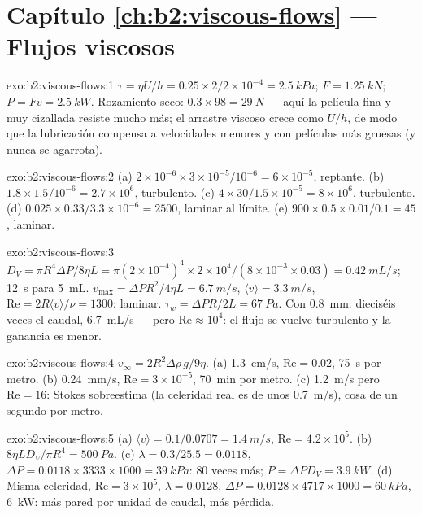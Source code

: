 \section*{Capítulo \ref{ch:b2:viscous-flows} --- Flujos viscosos}

\begin{solution}{exo:b2:viscous-flows:1}
$\tau = \eta U/h = 0.25 \times 2/2 \times 10^{-4} = \qty{2.5}{kPa}$; $F = \qty{1.25}{kN}$;
$P = Fv = \qty{2.5}{kW}$. Rozamiento seco: $0.3 \times 98 = \qty{29}{N}$ --- aquí la
película fina y muy cizallada resiste mucho más; el arrastre viscoso crece
como $U/h$, de modo que la lubricación compensa a velocidades menores y
con películas más gruesas (y nunca se agarrota).
\end{solution}

\begin{solution}{exo:b2:viscous-flows:2}
(a) $2 \times 10^{-6} \times 3 \times 10^{-5}/10^{-6} = 6 \times 10^{-5}$, reptante. (b)
$1.8 \times 1.5/10^{-6} = 2.7 \times 10^6$, turbulento. (c) $4 \times 30/1.5 \times 10^{-5}
= 8 \times 10^6$, turbulento. (d) $0.025 \times 0.33/3.3 \times 10^{-6} = 2500$,
laminar al límite. (e) $900 \times 0.5 \times 0.01/0.1 = 45$, laminar.
\end{solution}

\begin{solution}{exo:b2:viscous-flows:3}
$D_V = \pi R^4\Delta P/8\eta L = \pi(2 \times 10^{-4})^4 \times 2 \times 10^4/(8 \times 10^{-3}
\times 0.03) = \qty{0.42}{mL/s}$; \qty{12}{s} para \qty{5}{mL}. $v_{\max} = \Delta PR^2/
4\eta L = \qty{6.7}{m/s}$, $\langle v\rangle = \qty{3.3}{m/s}$, $\mathrm{Re} = 2R\langle v
\rangle/\nu = 1300$: laminar. $\tau_w = \Delta PR/2L = \qty{67}{Pa}$. Con \qty{0.8}{mm}:
dieciséis veces el caudal, \qty{6.7}{mL/s} --- pero $\mathrm{Re} \approx 10^4$: el flujo
se vuelve turbulento y la ganancia es menor.
\end{solution}

\begin{solution}{exo:b2:viscous-flows:4}
$v_\infty = 2R^2\Delta\rho\,g/9\eta$. (a) \qty{1.3}{cm/s}, $\mathrm{Re} = 0.02$, \qty{75}{s}
por metro. (b) \qty{0.24}{mm/s}, $\mathrm{Re} = 3 \times 10^{-5}$, \qty{70}{min} por
metro. (c) \qty{1.2}{m/s} pero $\mathrm{Re} = 16$: Stokes sobreestima (la
celeridad real es de unos \qty{0.7}{m/s}), cosa de un segundo por metro.
\end{solution}

\begin{solution}{exo:b2:viscous-flows:5}
(a) $\langle v\rangle = 0.1/0.0707 = \qty{1.4}{m/s}$, $\mathrm{Re} = 4.2 \times 10^5$. (b)
$8\eta LD_V/\pi R^4 = \qty{500}{Pa}$. (c) $\lambda = 0.3/25.5 = 0.0118$, $\Delta P = 0.0118
\times 3333 \times 1000 = \qty{39}{kPa}$: $80$ veces más; $P = \Delta PD_V = \qty{3.9}{kW}$.
(d) Misma celeridad, $\mathrm{Re} = 3 \times 10^5$, $\lambda = 0.0128$, $\Delta P = 0.0128 \times 4717
\times 1000 = \qty{60}{kPa}$, \qty{6}{kW}: más pared por unidad de caudal, más pérdida.
\end{solution}

